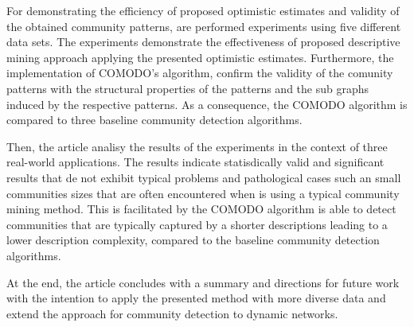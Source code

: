 \documentclass[a4paper]{article}
\begin{document}
For demonstrating the efficiency of proposed optimistic estimates and validity of the obtained community patterns, are performed experiments using five different data sets. The experiments demonstrate the effectiveness of proposed descriptive mining approach applying the presented optimistic estimates. Furthermore, the implementation of COMODO's algorithm, confirm the validity of the comunity patterns with the structural properties of the patterns and the sub graphs induced by the respective patterns. As a consequence, the COMODO algorithm is compared to three baseline community detection algorithms.
\vskip 0.3cm

Then, the article analisy the results of the experiments in the context of three real-world applications. The results indicate statisdically valid and significant results that de not exhibit typical problems and pathological cases such an small communities sizes that are often encountered when is using a typical community mining method. This is facilitated by the COMODO algorithm is able to detect communities that are typically captured by a shorter descriptions leading to a lower description complexity, compared to the baseline community detection algorithms.
\vskip 0.3cm

At the end, the article concludes with a summary and directions for future work with the intention to apply the presented method with more diverse data and extend the approach for community detection to dynamic networks.
\end{document}
